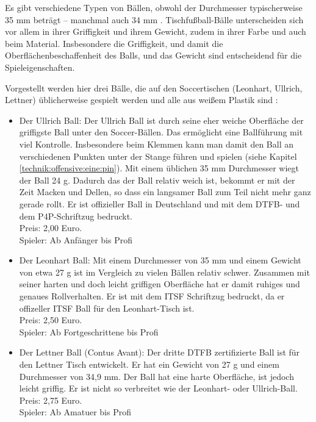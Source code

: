 Es gibt verschiedene Typen von Bällen, obwohl der Durchmesser typischerweise 35 mm beträgt -- manchmal auch 34 mm \citep{www:kickerbau:baelle}.
Tischfußball-Bälle unterscheiden sich vor allem in ihrer Griffigkeit und ihrem Gewicht, zudem in ihrer Farbe und auch beim Material.
Insbesondere die Griffigkeit, und damit die Oberflächenbeschaffenheit des Balls, und das Gewicht sind entscheidend für die Spieleigenschaften.  

Vorgestellt werden hier drei Bälle, die auf den Soccertischen (Leonhart, Ullrich, Lettner) üblicherweise gespielt werden und alle aus weißem Plastik sind \citep{www:tfc-reutlingen}:
\begin{itemize}
    \item Der Ullrich Ball:
        Der Ullrich Ball ist durch seine eher weiche Oberfläche der griffigste Ball unter den Soccer-Bällen. 
        Das ermöglicht eine Ballführung mit viel Kontrolle. Insbesondere beim Klemmen kann man damit den Ball an verschiedenen Punkten unter der Stange führen und spielen (siehe Kapitel \ref{technik:offensive:eine:pin}).
        Mit einem üblichen 35 mm Durchmesser wiegt der Ball 24 g.
        Dadurch das der Ball relativ weich ist, bekommt er mit der Zeit Macken und Dellen, so dass ein langsamer Ball zum Teil nicht mehr ganz gerade rollt.
        Er ist offizieller Ball in Deutschland und mit dem DTFB- und dem P4P-Schriftzug bedruckt.
        \\
        Preis: 2,00 Euro. 
        \\
        Spieler: Ab Anfänger bis Profi
    \item Der Leonhart Ball: 
        Mit einem Durchmesser von 35 mm und einem Gewicht von etwa 27 g ist im Vergleich zu vielen Bällen relativ schwer. 
        Zusammen mit seiner harten und doch leicht griffigen Oberfläche hat er damit ruhiges und genaues Rollverhalten.
        Er ist mit dem ITSF Schriftzug bedruckt, da er offizeller ITSF Ball für den Leonhart-Tisch ist.
        \\
        Preis: 2,50 Euro. 
        \\
        Spieler: Ab Fortgeschrittene bis Profi
    \item Der Lettner Ball (Contus Avant):
        Der dritte DTFB zertifizierte Ball ist für den Lettner Tisch entwickelt.
        Er hat ein Gewicht von 27 g und einem Durchmesser von 34,9 mm.
        Der Ball hat eine harte Oberfläche, ist jedoch leicht griffig. 
        Er ist nicht so verbreitet wie der Leonhart- oder Ullrich-Ball. 
        \\
        Preis: 2,75 Euro.
        \\
        Spieler: Ab Amatuer bis Profi
\end{itemize}


